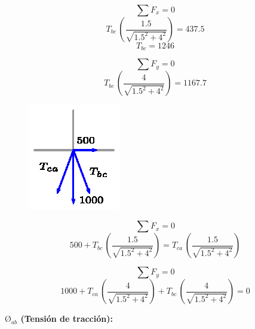 \documentclass[letter,10pt,twoside]{article}
\begin{document}
\begin{equation*}
    \sum{F_x} = 0
\end{equation*}
\begin{equation*}
    T_{bc}\,\left(\frac{1.5}{\sqrt{1.5^2+4^2}}\right) = 437.5
\end{equation*}
\begin{equation*}
    T_{bc} = 1246
\end{equation*}

\begin{equation*}
    \sum{F_y} = 0
\end{equation*}
\begin{equation*}
    T_{bc}\,\left(\frac{4}{\sqrt{1.5^2+4^2}}\right) = 1167.7
\end{equation*}

\begin{figure}[H]
\centering
\includegraphics[scale=1.8]{resources/x0403.eps}
\end{figure}

\begin{equation*}
    \sum{F_x} = 0
\end{equation*}
\begin{equation*}
    500 + T_{bc}\,\left(\frac{1.5}{\sqrt{1.5^2+4^2}}\right) = T_{ca}\,\left(\frac{1.5}{\sqrt{1.5^2+4^2}}\right)
\end{equation*}

\begin{equation*}
    \sum{F_y} = 0
\end{equation*}
\begin{equation*}
    1000 + T_{ca}\,\left(\frac{4}{\sqrt{1.5^2+4^2}}\right) + T_{bc}\,\left(\frac{4}{\sqrt{1.5^2+4^2}}\right) = 0
\end{equation*}

\textbf{$\text{\O}_{ab}$ (Tensión de tracción):}
\end{document}
